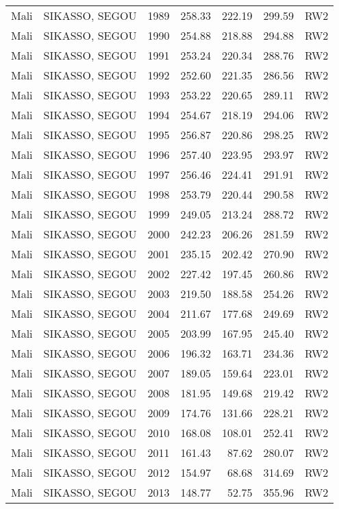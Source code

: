 \begin{longtable}{lllrrrl}
  Mali & SIKASSO, SEGOU & 1989 & 258.33 & 222.19 & 299.59 & RW2 \\ 
  Mali & SIKASSO, SEGOU & 1990 & 254.88 & 218.88 & 294.88 & RW2 \\ 
  Mali & SIKASSO, SEGOU & 1991 & 253.24 & 220.34 & 288.76 & RW2 \\ 
  Mali & SIKASSO, SEGOU & 1992 & 252.60 & 221.35 & 286.56 & RW2 \\ 
  Mali & SIKASSO, SEGOU & 1993 & 253.22 & 220.65 & 289.11 & RW2 \\ 
  Mali & SIKASSO, SEGOU & 1994 & 254.67 & 218.19 & 294.06 & RW2 \\ 
  Mali & SIKASSO, SEGOU & 1995 & 256.87 & 220.86 & 298.25 & RW2 \\ 
  Mali & SIKASSO, SEGOU & 1996 & 257.40 & 223.95 & 293.97 & RW2 \\ 
  Mali & SIKASSO, SEGOU & 1997 & 256.46 & 224.41 & 291.91 & RW2 \\ 
  Mali & SIKASSO, SEGOU & 1998 & 253.79 & 220.44 & 290.58 & RW2 \\ 
  Mali & SIKASSO, SEGOU & 1999 & 249.05 & 213.24 & 288.72 & RW2 \\ 
  Mali & SIKASSO, SEGOU & 2000 & 242.23 & 206.26 & 281.59 & RW2 \\ 
  Mali & SIKASSO, SEGOU & 2001 & 235.15 & 202.42 & 270.90 & RW2 \\ 
  Mali & SIKASSO, SEGOU & 2002 & 227.42 & 197.45 & 260.86 & RW2 \\ 
  Mali & SIKASSO, SEGOU & 2003 & 219.50 & 188.58 & 254.26 & RW2 \\ 
  Mali & SIKASSO, SEGOU & 2004 & 211.67 & 177.68 & 249.69 & RW2 \\ 
  Mali & SIKASSO, SEGOU & 2005 & 203.99 & 167.95 & 245.40 & RW2 \\ 
  Mali & SIKASSO, SEGOU & 2006 & 196.32 & 163.71 & 234.36 & RW2 \\ 
  Mali & SIKASSO, SEGOU & 2007 & 189.05 & 159.64 & 223.01 & RW2 \\ 
  Mali & SIKASSO, SEGOU & 2008 & 181.95 & 149.68 & 219.42 & RW2 \\ 
  Mali & SIKASSO, SEGOU & 2009 & 174.76 & 131.66 & 228.21 & RW2 \\ 
  Mali & SIKASSO, SEGOU & 2010 & 168.08 & 108.01 & 252.41 & RW2 \\ 
  Mali & SIKASSO, SEGOU & 2011 & 161.43 & 87.62 & 280.07 & RW2 \\ 
  Mali & SIKASSO, SEGOU & 2012 & 154.97 & 68.68 & 314.69 & RW2 \\ 
  Mali & SIKASSO, SEGOU & 2013 & 148.77 & 52.75 & 355.96 & RW2 \\ 

\end{longtable}
